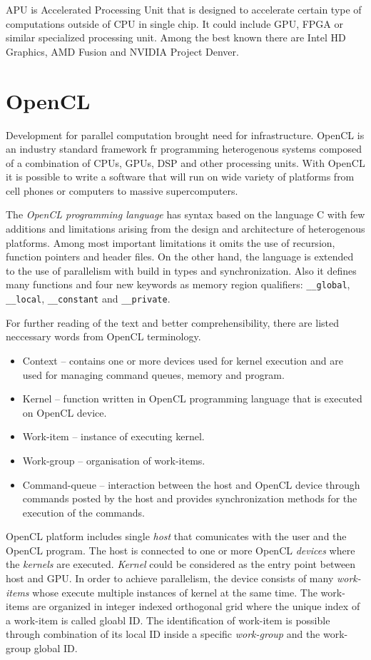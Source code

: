 APU is Accelerated Processing Unit that is designed to accelerate certain
type of computations outside of CPU in single chip\cite{wiki:apu}. It could 
include GPU, FPGA or similar specialized processing unit. Among the best known 
there are Intel HD Graphics\cite{intel:apu}, AMD Fusion\cite{amd:apu} and NVIDIA 
Project Denver\cite{nvidia:apu}.

\section{OpenCL}
Development for parallel computation brought need for infrastructure. OpenCL
is an industry standard framework fr programming heterogenous systems 
composed of a combination of CPUs, GPUs, DSP and other processing 
units\cite{opencl}. With OpenCL it is possible to write a software that will
run on wide variety of platforms from cell phones or computers to massive
supercomputers. 

The \textit{OpenCL programming language} has syntax based
on the language C with few additions and limitations arising from the design
and architecture of heterogenous platforms. Among most important limitations
it omits the use of recursion, function pointers and header files. On the 
other hand, the language is extended to the use of parallelism with build 
in types and synchronization. Also it defines many functions and four new
keywords as memory region qualifiers: \texttt{\_\_global}, 
\texttt{\_\_local}, \texttt{\_\_constant} and \texttt{\_\_private}.

For further reading of the text and better comprehensibility, there are
listed neccessary words from OpenCL terminology\cite{opencl}.
\begin{itemize}
\item Context -- contains one or more devices used for kernel execution
and are used for managing command queues, memory and program.
\item Kernel -- function written in OpenCL programming language that 
is executed on OpenCL device. 
\item Work-item -- instance of executing kernel. 
\item Work-group -- organisation of work-items. 
\item Command-queue -- interaction between the host and OpenCL
device through commands posted by the host and provides synchronization
methods for the execution of the commands.
\end{itemize}

OpenCL platform includes single \textit{host} that comunicates with the user
and the OpenCL program. The host is connected to one or more
OpenCL \textit{devices} where the \textit{kernels} are executed. 
\textit{Kernel} could be considered as the entry point between host and
GPU. In order to achieve parallelism, the device consists of many 
\textit{work-items} whose execute multiple instances of kernel at the same 
time. The work-items are organized in integer indexed orthogonal grid where 
the unique index of a work-item is called gloabl ID. The identification
of work-item is possible through combination of its local ID inside a specific
\textit{work-group} and the work-group global ID.

